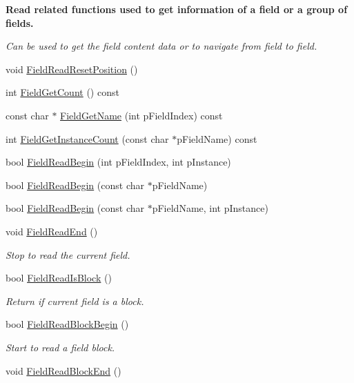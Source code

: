 \begin{Indent}\textbf{ Read related functions used to get information of a field or a group of fields.}\par
{\em Can be used to get the field content data or to navigate from field to field. }\begin{DoxyCompactItemize}
\item 
void \hyperlink{class_fbx_i_o_a21b52388d8b73e513c75b86f3502e5d8}{Field\+Read\+Reset\+Position} ()
\item 
int \hyperlink{class_fbx_i_o_a03e5080780554283a6ffedb11b8c352a}{Field\+Get\+Count} () const
\item 
const char $\ast$ \hyperlink{class_fbx_i_o_afb555f3f58c25736a9f22925eb91f6d9}{Field\+Get\+Name} (int p\+Field\+Index) const
\item 
int \hyperlink{class_fbx_i_o_ae9e361e4efad6e15289bf0eafa651866}{Field\+Get\+Instance\+Count} (const char $\ast$p\+Field\+Name) const
\item 
bool \hyperlink{class_fbx_i_o_a0e7e1a7e91b4f5ae33e4bcf93cf315cf}{Field\+Read\+Begin} (int p\+Field\+Index, int p\+Instance)
\item 
bool \hyperlink{class_fbx_i_o_af40603ed3c18987812af2ac379f977b7}{Field\+Read\+Begin} (const char $\ast$p\+Field\+Name)
\item 
bool \hyperlink{class_fbx_i_o_a5decc7ebf07bd318f3bc019e9c275a78}{Field\+Read\+Begin} (const char $\ast$p\+Field\+Name, int p\+Instance)
\item 
void \hyperlink{class_fbx_i_o_ad9af4f4386944e7efa6167b8e2cc08f7}{Field\+Read\+End} ()
\begin{DoxyCompactList}\small\item\em Stop to read the current field. \end{DoxyCompactList}\item 
bool \hyperlink{class_fbx_i_o_ac9c7d089db2f954f947e5b97a23e6f89}{Field\+Read\+Is\+Block} ()
\begin{DoxyCompactList}\small\item\em Return if current field is a block. \end{DoxyCompactList}\item 
bool \hyperlink{class_fbx_i_o_a870652de9c203f5524ad1cc259ad3665}{Field\+Read\+Block\+Begin} ()
\begin{DoxyCompactList}\small\item\em Start to read a field block. \end{DoxyCompactList}\item 
void \hyperlink{class_fbx_i_o_ac7d112e960624dbcdf4fb5445516b214}{Field\+Read\+Block\+End} ()

\end{DoxyCompactItemize}
\end{Indent}
